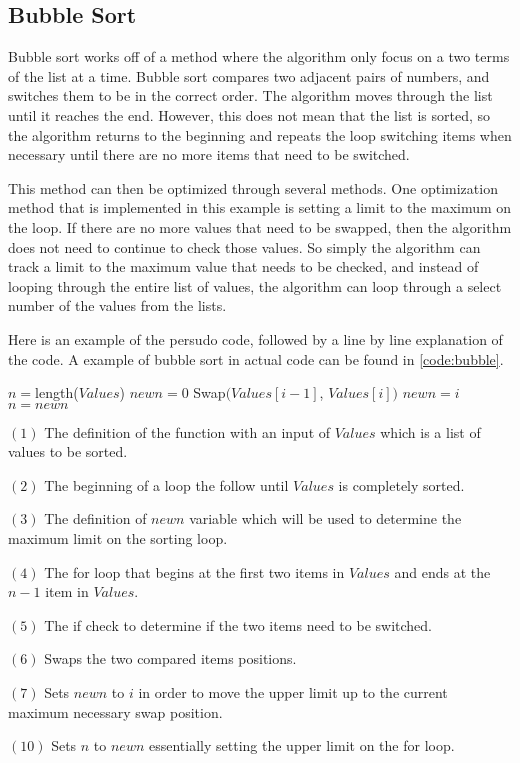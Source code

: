 \documentclass{article}
\begin{document}
\subsection{Bubble Sort}
\begin{multicols}{2}
Bubble sort works off of a method where the algorithm only focus on a two terms of the list at a time. Bubble sort compares two adjacent pairs of numbers, and switches them to be in the correct order. The algorithm moves through the list until it reaches the end. However, this does not mean that the list is sorted, so the algorithm returns to the beginning and repeats the loop switching items when necessary until there are no more items that need to be switched.

This method can then be optimized through several methods. One optimization method that is implemented in this example is setting a limit to the maximum on the loop. If there are no more values that need to be swapped, then the algorithm does not need to continue to check those values. So simply the algorithm can track a limit to the maximum value that needs to be checked, and instead of looping through the entire list of values, the algorithm can loop through a select number of the values from the lists.

Here is an example of the persudo code, followed by a line by line explanation of the code. A example of bubble sort in actual code can be found in \ref{code:bubble}.
\end{multicols}
\begin{algorithmic}
\State $n=$length($Values$)
\State $newn=0$
\State Swap$(Values[i-1]$, $Values[i])$
\State $newn=i$
\EndIf
\EndFor
\State $n=newn$
\EndWhile
\EndFunction
\end{algorithmic}
\begin{multicols}{2}
$(1)$ The definition of the function with an input of $Values$ which is a list of values to be sorted.

$(2)$ The beginning of a loop the follow until $Values$ is completely sorted.

$(3)$ The definition of $newn$ variable which will be used to determine the maximum limit on the sorting loop.

$(4)$ The for loop that begins at the first two items in $Values$ and ends at the $n-1$ item in $Values$.

$(5)$ The if check to determine if the two items need to be switched.

$(6)$ Swaps the two compared items positions.

$(7)$ Sets $newn$ to $i$ in order to move the upper limit up to the current maximum necessary swap position.

$(10)$ Sets $n$ to $newn$ essentially setting the upper limit on  the for loop.
\end{multicols}
\end{document}
